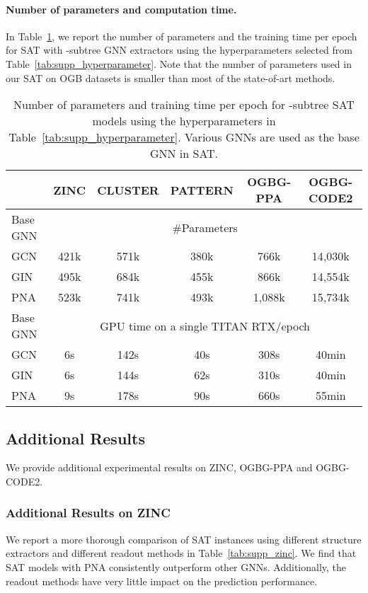 \paragraph{Number of parameters and computation time.}
In Table~\ref{tab:supp_number_parameter}, we report the number of parameters and the training time per epoch for SAT with -subtree GNN extractors using the hyperparameters selected from Table~\ref{tab:supp_hyperparameter}. Note that the number of parameters used in our SAT on OGB datasets is smaller than most of the state-of-art methods.

\begin{table}[]
    \centering
    \caption{Number of parameters and training time per epoch for -subtree SAT models using the hyperparameters in Table~\ref{tab:supp_hyperparameter}. Various GNNs are used as the base GNN in SAT.}
    \label{tab:supp_number_parameter}
    \begin{tabular}{lccccc}
        \toprule
& \textbf{ZINC} & \textbf{CLUSTER} & \textbf{PATTERN} & \textbf{OGBG-PPA} & \textbf{OGBG-CODE2} \\
         \midrule
         Base GNN & \multicolumn{5}{c}{\#Parameters} \\
         GCN & 421k & 571k & 380k & 766k & 14,030k \\
         GIN & 495k & 684k & 455k & 866k & 14,554k \\
         PNA & 523k & 741k & 493k & 1,088k & 15,734k \\ 
         \midrule
         Base GNN & \multicolumn{5}{c}{GPU time on a single TITAN RTX/epoch} \\ 
         GCN & 6s & 142s & 40s & 308s & 40min \\
         GIN & 6s & 144s & 62s & 310s & 40min \\
         PNA & 9s & 178s & 90s & 660s & 55min \\
         \bottomrule
    \end{tabular}
\end{table}

\subsection{Additional Results}
We provide additional experimental results on ZINC, OGBG-PPA and OGBG-CODE2.

\subsubsection{Additional Results on ZINC}
We report a more thorough comparison of SAT instances using different structure extractors and different readout methods in Table~\ref{tab:supp_zinc}. We find that SAT models with PNA consistently outperform other GNNs. Additionally, the readout methods have very little impact on the prediction performance.

